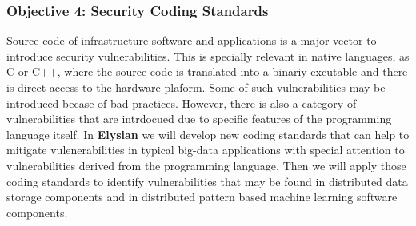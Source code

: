 \documentclass[a4paper,11pt]{article}
\newcommand{\project}[1]{\textbf{#1}\xspace}
\newcommand{\SECURITY}{\project{Elysian}}
\newcommand{\TheProject}{\SECURITY}
\begin{document}

\subsubsection*{Objective 4: Security Coding Standards}
Source code of infrastructure software and applications is a major vector to introduce security vulnerabilities. This is specially relevant in native languages, as C or C++, where the source code is translated into a binariy excutable and there is direct access to the hardware plaform. Some of such vulnerabilities may be introduced becase of bad practices. However, there is also a category of vulnerabilities that are intrdocued due to specific features of the programming language itself.
In \TheProject{} we will develop new coding standards that can help to mitigate vulenerabilities in typical big-data applications with special attention to vulnerabilities derived from  the programming language. Then we will apply those coding standards to identify vulnerabilities that may be found in distributed data storage components and in distributed pattern based machine learning software components.
\end{document}
